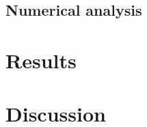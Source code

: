 \documentclass{imammb}
\numberwithin{equation}{section}
\begin{document}
\subsection{Numerical analysis} %


\section{Results}

\section{Discussion}


 










\end{document}
